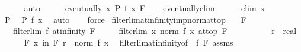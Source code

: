 \begin{isabellebody}
\ \ \ \ \isamarkupfalse%
\ auto\isanewline
\ \ \isamarkupfalse%
\ \isamarkupfalse%
\ {\isachardoublequoteopen}eventually\ {\isacharparenleft}{\kern0pt}{\isasymlambda}x{\isachardot}{\kern0pt}\ P\ {\isacharparenleft}{\kern0pt}f\ x{\isacharparenright}{\kern0pt}{\isacharparenright}{\kern0pt}\ F{\isachardoublequoteclose}\isanewline
\ \ \isamarkupfalse%
\ eventually{\isacharunderscore}{\kern0pt}elim\isanewline
\ \ \ \ \isamarkupfalse%
\ {\isacharparenleft}{\kern0pt}elim\ x{\isacharparenright}{\kern0pt}\isanewline
\ \ \ \ \isamarkupfalse%
\ P\ \isamarkupfalse%
\ {\isachardoublequoteopen}P\ {\isacharparenleft}{\kern0pt}f\ x{\isacharparenright}{\kern0pt}{\isachardoublequoteclose}\ \isamarkupfalse%
\ auto\isanewline
\ \ \isamarkupfalse%
\isanewline
{}\isamarkupfalse%
\ force%
\endisatagproof
{\isafoldproof}%
%
\isadelimproof
\isanewline
%
\endisadelimproof
\isanewline
{}\isamarkupfalse%
\ filterlim{\isacharunderscore}{\kern0pt}at{\isacharunderscore}{\kern0pt}infinity{\isacharunderscore}{\kern0pt}imp{\isacharunderscore}{\kern0pt}norm{\isacharunderscore}{\kern0pt}at{\isacharunderscore}{\kern0pt}top{\isacharcolon}{\kern0pt}\isanewline
\ \ \ F\isanewline
\ \ \ {\isachardoublequoteopen}filterlim\ f\ at{\isacharunderscore}{\kern0pt}infinity\ F{\isachardoublequoteclose}\isanewline
\ \ \ \ \ {\isachardoublequoteopen}filterlim\ {\isacharparenleft}{\kern0pt}{\isasymlambda}x{\isachardot}{\kern0pt}\ norm\ {\isacharparenleft}{\kern0pt}f\ x{\isacharparenright}{\kern0pt}{\isacharparenright}{\kern0pt}\ at{\isacharunderscore}{\kern0pt}top\ F{\isachardoublequoteclose}\isanewline
%
\isadelimproof
%
\endisadelimproof
%
\isatagproof
{}\isamarkupfalse%
\ {\isacharminus}{\kern0pt}\isanewline
\ \ \isacommand{{\isacharbraceleft}{\kern0pt}}\isamarkupfalse%
\isanewline
\ \ \ \ \isamarkupfalse%
\ r\ {\isacharcolon}{\kern0pt}{\isacharcolon}{\kern0pt}\ real\isanewline
\ \ \ \ \isamarkupfalse%
\ {\isachardoublequoteopen}{\isasymforall}\isactrlsub F\ x\ in\ F{\isachardot}{\kern0pt}\ r\ {\isasymle}\ norm\ {\isacharparenleft}{\kern0pt}f\ x{\isacharparenright}{\kern0pt}{\isachardoublequoteclose}\ \isamarkupfalse%
\ filterlim{\isacharunderscore}{\kern0pt}at{\isacharunderscore}{\kern0pt}infinity{\isacharbrackleft}{\kern0pt}of\ {}\ f\ F{\isacharbrackright}{\kern0pt}\ assms\isanewline
\ \ \ \ \ \ \isamarkupfalse%

\end{isabellebody}
